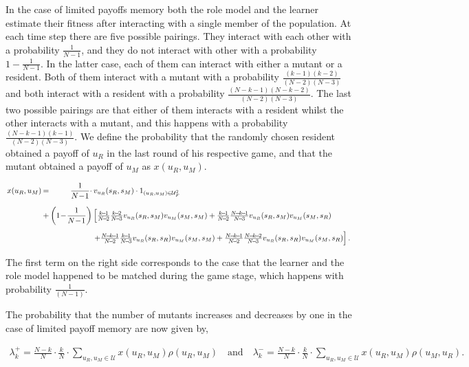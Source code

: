 \documentclass[11pt]{article}
\theoremstyle{plainCl1}
\theoremstyle{plainCl2}
\begin{document}
In the case of limited payoffs memory both the role model and the learner
estimate their fitness after interacting with a single member of the population.
At each time step there are five possible pairings. They interact with each
other with a probability \(\frac{1}{N - 1}\), and they do not interact with
other with a probability \(1 - \frac{1}{N - 1}\). In the latter case, each of
them can interact with either a mutant or a resident. Both of them interact with
a mutant with a probability $\frac{(k-1)(k-2)}{(N-2)(N-3)}$ and both interact
with a resident with a probability $\frac{(N-k-1)(N-k-2)}{(N-2)(N-3)}$. The last
two possible pairings are that either of them interacts with a resident whilst
the other interacts with a mutant, and this happens with a probability
$\frac{(N-k-1)(k-1)}{(N-2)(N-3)}$. We define the probability that the randomly
chosen resident obtained a payoff of $u_R$ in the last round of his respective
game, and that the mutant obtained a payoff of $u_M$ as $x(u_R,u_M)$.

\begin{equation}\label{eq:Chi}
\setlength{\arraycolsep}{1pt}
\begin{array}{llrl}
x(u_R,u_M)	 &=&\displaystyle \frac{1}{N\!-\!1}\cdot  &v_{u_R}(s_R,s_M)\cdot 1_{(u_R,u_M)\in \mathcal{U}^2_F}\\[0.5cm]
&+	
&\displaystyle \left(1\!-\!\frac{1}{N\!-\!1}\right)  
&\left[ \frac{k\!-\!1}{N\!-\!2}\frac{k\!-\!2}{N\!-\!3} v_{u_R}(s_R,s_M) v_{u_M}(s_M,s_M) + 
 \frac{k\!-\!1}{N\!-\!2}\frac{N\!-\!k\!-\!1}{N\!-\!3} v_{u_R}(s_R,s_M) v_{u_M}(s_M,s_R)\right.\\[0.5cm]
&&&\left. +\frac{N\!-\!k\!-\!1}{N\!-\!2}\frac{k\!-\!1}{N\!-\!3} v_{u_R}(s_R,s_R) v_{u_M}(s_M,s_M) + 
 \frac{N\!-\!k\!-\!1}{N\!-\!2}\frac{N\!-\!k\!-\!2}{N\!-\!3} v_{u_R}(s_R,s_R) v_{u_M}(s_M,s_R)\right].
\end{array}
\end{equation}

The first term on the right side corresponds to the case that the learner and
the role model happened to be matched during the game stage, which happens with
probability $\frac{1}{(N\!-\!1)}$.

The probability that the number of mutants increases and decreases by one in the
case of limited payoff memory are now given by,

\begin{align}\label{eq:limited_memory_lambdas}
\lambda^+_k=\frac{N\!-\!k}{N} \cdot \frac{k}{N} \cdot \sum_{u_{R},u_{M}\in\mathcal{U}} x(u_{R},u_{M}) \rho(u_{R},u_{M}) \quad \text{and} \quad
\lambda^-_k=\frac{N\!-\!k}{N} \cdot \frac{k}{N} \cdot \sum_{u_{R},u_{M}\in\mathcal{U}} x(u_{R},u_{M}) \rho(u_{M},u_{R}).
\end{align}
\end{document}
